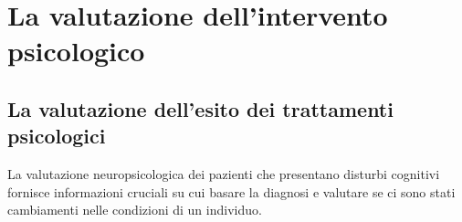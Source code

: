 
\chapter{La valutazione dell'intervento psicologico }
\label{ch:effect_size}


\section{La valutazione dell'esito dei trattamenti psicologici}

La valutazione neuropsicologica dei pazienti che presentano disturbi cognitivi fornisce informazioni cruciali su cui basare la diagnosi e valutare se ci sono stati cambiamenti nelle condizioni di un individuo. 
